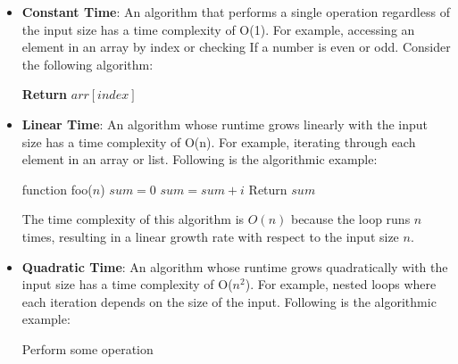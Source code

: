 \documentclass[12pt]{book} %
\begin{document}
\begin{itemize}
    \item \textbf{Constant Time}: An algorithm that performs a single operation regardless of the input size has a time complexity of O(1). For example, accessing an element in an array by index or checking If a number is even or odd.
    \FloatBarrier
    Consider the following algorithm:
    \FloatBarrier
    \begin{algorithm}
\caption{Access Element in Array}
\begin{algorithmic}[1]
    \State \textbf{Return} $arr[index]$
\EndFunction
\end{algorithmic}
\end{algorithm}
\FloatBarrier
    \item \textbf{Linear Time}: An algorithm whose runtime grows linearly with the input size has a time complexity of O(n). For example, iterating through each element in an array or list.
    \FloatBarrier
    Following is the algorithmic example:
\FloatBarrier
\begin{algorithm}[H]
\caption{Example Algorithm For Big O Notation}
\begin{algorithmic}
\State function foo($n$)
\State $sum = 0$
\State $sum = sum + i$
\EndFor
\State Return $sum$
\end{algorithmic}
\end{algorithm}
\FloatBarrier
The time complexity of this algorithm is $O(n)$ because the loop runs $n$ times, resulting in a linear growth rate with respect to the input size $n$.
    \FloatBarrier
    \item \textbf{Quadratic Time}: An algorithm whose runtime grows quadratically with the input size has a time complexity of O($n^2$). For example, nested loops where each iteration depends on the size of the input.
    \FloatBarrier
    Following is the algorithmic example:
    \FloatBarrier
    \begin{algorithm}
\caption{Nested Loop}
\begin{algorithmic}[1]
            \State Perform some operation
        \EndFor
    \EndFor
\EndFunction
\end{algorithmic}
\end{algorithm}
\FloatBarrier
\end{itemize}
\end{document}
